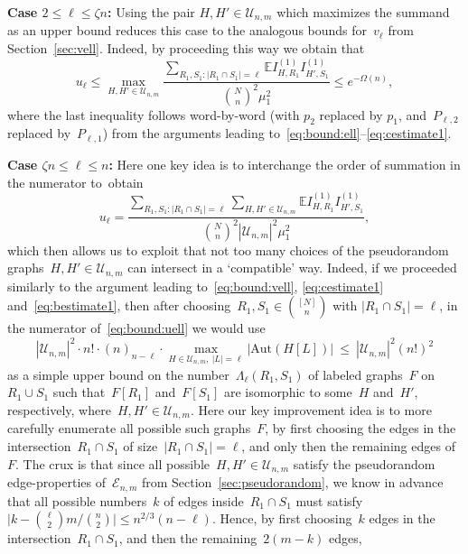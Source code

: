 \documentclass{article}
\newcommand{\E}{\mathbb{E}}
\newcommand{\cE}{\mathcal{E}}
\newcommand{\T}{\mathcal{U}_{n,m}}
\newcommand\abs[1]{\left|#1\right|}
\newcommand{\ione}{I^{(1)}}
\newcommand{\Aut}{\mathrm{Aut}}
\renewcommand{\u}{u}
\renewcommand{\v}{v}
\newcommand\bigabs[1]{\bigl|#1\bigr|}
\begin{document}
\textbf{Case  $2\le \ell\le \zeta n$:}
Using the pair $H,H'\in \T$ which maximizes the summand as an upper bound reduces this case to the analogous bounds for~$\v_{\ell}$ 
from Section~\ref{sec:vell}. Indeed, by proceeding this way we obtain that 
\begin{equation}\label{eq:bestimate1}
    \u_\ell \le \max_{H,H'\in \T} \frac{\sum_{R_1,S_1:|R_1\cap S_1|=\ell}\E \ione_{H,R_1}\ione_{H',S_1}}{\binom{N}{n}^2\mu_1^2}\le e^{-\Omega(n)},
\end{equation}
where the last inequality follows word-by-word (with $p_2$ replaced by $p_1$, and~$P_{\ell,2}$ replaced by~$P_{\ell,1}$)
from the arguments leading to~\eqref{eq:bound:ell}--\eqref{eq:cestimate1}.

\textbf{Case $\zeta n \le \ell \leq n$:} 
Here one key idea is to interchange the order of summation in the numerator to~obtain
\begin{equation}\label{eq:bound:uell}
\u_{\ell} = 
\frac{\sum_{R_1,S_1:|R_1\cap S_1|=\ell}\sum_{H,H'\in \T}\E \ione_{H,R_1}\ione_{H',S_1}}{\binom{N}{n}^2|\T|^2\mu_1^2} ,
\end{equation}
which then allows us to exploit that not too many choices of the pseudorandom graphs~$H,H' \in \T$ can intersect in a `compatible' way. 
Indeed, if we proceeded similarly to the argument leading to~\eqref{eq:bound:vell}, \eqref{eq:cestimate1} and~\eqref{eq:bestimate1}, 
then after choosing~${R_1,S_1 \in \binom{[N]}{n}}$ with $\abs{R_1 \cap S_1} = \ell$, 
in the numerator of~\eqref{eq:bound:uell} we would use
\begin{equation*}|\T|^2 \cdot n! \cdot (n)_{n-\ell} \cdot \max_{H\in \T,  \: |L|=\ell} |\Aut(H[L])| \: \le \:  |\T|^2 (n!)^2 
\end{equation*}
as a simple upper bound  on the number~$\Lambda_{\ell}(R_1,S_1)$ of labeled graphs~$F$ on~$R_1 \cup S_1$ such that~$F[R_1]$ and~$F[S_1]$ are isomorphic to some~$H$ and~$H'$, respectively, where~$H,H' \in \T$. 
Here our key improvement idea is to more carefully enumerate all possible such graphs~$F$, by first choosing the edges in the intersection~$R_1 \cap S_1$ of size~$|R_1 \cap S_1|=\ell$, and only then the remaining edges of~$F$. 
The crux is that since all possible~$H,H' \in \T$ satisfy the pseudorandom edge-properties of~$\cE_{n,m}$ from Section~\ref{sec:pseudorandom}, 
we know in advance that all possible numbers~$k$ of edges inside~$R_1 \cap S_1$ must satisfy $\bigabs{k-\binom{\ell}{2}m/\binom{n}{2}} \le n^{2/3}(n-\ell)$. 
Hence, by first choosing~$k$ edges in the intersection~$R_1 \cap S_1$, and then the remaining~$2(m-k)$ edges, 
\end{document}
